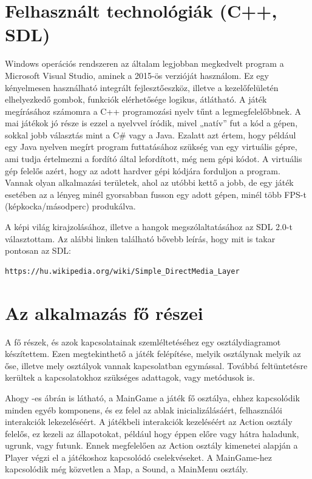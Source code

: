 \label{Chap:komponensek}

\section{Felhasznált technológiák (C++, SDL)}

Windows operációs rendszeren az általam legjobban megkedvelt program a Microsoft Visual Studio, aminek a 2015-ös verzióját használom. Ez egy kényelmesen használható integrált fejlesztőeszköz, illetve a kezelőfelületén elhelyezkedő gombok, funkciók elérhetősége logikus, átlátható. A játék megírásához számomra a C++ programozási nyelv tűnt a legmegfelelőbbnek. A mai játékok jó része is ezzel a nyelvvel íródik, mivel „natív” fut a kód a gépen, sokkal jobb választás mint a C\# vagy a Java. Ezalatt azt értem, hogy például egy Java nyelven megírt program futtatásához szükség van egy virtuális gépre, ami tudja értelmezni a fordító által lefordított, még nem gépi kódot. A virtuális gép felelős azért, hogy az adott hardver gépi kódjára forduljon a program. Vannak olyan alkalmazási területek, ahol az utóbbi kettő a jobb, de egy játék esetében az a lényeg minél gyorsabban fusson egy adott gépen, minél több FPS-t (képkocka/másodperc) produkálva.

A képi világ kirajzolásához, illetve a hangok megszólaltatásához az SDL 2.0-t választottam. Az alábbi linken található bővebb leírás, hogy mit is takar pontosan az SDL:

\begin{verbatim}
https://hu.wikipedia.org/wiki/Simple_DirectMedia_Layer
\end{verbatim}

\section{Az alkalmazás fő részei}

A fő részek, és azok kapcsolatainak szemléltetéséhez egy osztálydiagramot készítettem. Ezen megtekinthető a játék felépítése, melyik osztálynak melyik az őse, illetve mely osztályok vannak kapcsolatban egymással. Továbbá feltüntetésre kerültek a kapcsolatokhoz szükséges adattagok, vagy metódusok is.

Ahogy -es ábrán is látható, a MainGame a játék fő osztálya, ehhez kapcsolódik minden egyéb komponens, és ez felel az ablak inicializálásáért, felhasználói interakciók lekezeléséért. A játékbeli interakciók kezeléséért az Action osztály felelős, ez kezeli az állapotokat, például hogy éppen előre vagy hátra haladunk, ugrunk, vagy futunk. Ennek megfelelően az Action osztály kimenetei alapján a Player végzi el a játékoshoz kapcsolódó cselekvéseket. A MainGame-hez kapcsolódik még közvetlen a Map, a Sound, a MainMenu osztály. 

